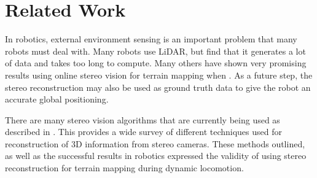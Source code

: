 
\section{Related Work}

In robotics, external environment sensing is an important problem that many robots must deal with. Many robots use LiDAR, but find that it generates a lot of data and takes too long to compute. Many others have shown very promising results using online stereo vision for terrain mapping when \cite{5152795,DBLP:conf/humanoids/FallonMDWAMT15}. As a future step, the stereo reconstruction may also be used as ground truth data to give the robot an accurate global positioning.

There are many stereo vision algorithms that are currently being used as described in \cite{journals/js/HamzahI16}. This provides a wide survey of different techniques used for reconstruction of 3D information from stereo cameras. These methods outlined, as well as the successful results in robotics expressed the validity of using stereo reconstruction for terrain mapping during dynamic locomotion.